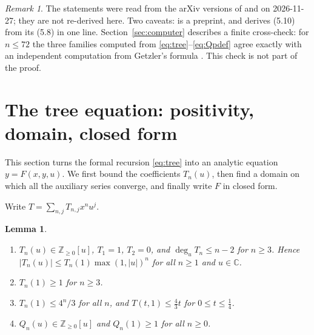 \documentclass[11pt]{amsart}
\newtheorem{lemma}[theorem]{Lemma}
\theoremstyle{definition}
\theoremstyle{remark}
\newtheorem*{remark*}{Remark}
\numberwithin{equation}{section}
\newcommand{\CC}{\mathbb{C}}
\newcommand{\ZZ}{\mathbb{Z}}
\newcommand{\abs}[1]{\lvert #1\rvert}
\begin{document}
\begin{remark*}
The statements were read from the arXiv versions of \cite{CKL} and \cite{CK} on 2026-11-27; they are not re-derived here. Two caveats: \cite{CKL} is a preprint, and \cite{CK} derives (5.10) from its (5.8) in one line. Section~\ref{sec:computer} describes a finite cross-check: for \(n\le72\) the three families computed from \eqref{eq:tree}--\eqref{eq:Qpdef} agree exactly with an independent computation from Getzler's formula \cite[Thms.~5.7, 5.9]{Ge}. This check is not part of the proof.
\end{remark*}

\section{The tree equation: positivity, domain, closed form}\label{sec:tree}

This section turns the formal recursion \eqref{eq:tree} into an analytic equation \(y=F(x,y,u)\). We first bound the coefficients \(T_n(u)\), then find a domain on which all the auxiliary series converge, and finally write \(F\) in closed form.

Write \(T=\sum_{n,j}T_{n,j}x^nu^j\).

\begin{lemma}\label{lem:pos}
\begin{enumerate}
\item \(T_n(u)\in\ZZ_{\ge0}[u]\), \(T_1=1\), \(T_2=0\), and \(\deg_uT_n\le n-2\) for \(n\ge3\). Hence \(\abs{T_n(u)}\le T_n(1)\max(1,\abs{u})^n\) for all \(n\ge1\) and \(u\in\CC\).
\item \(T_n(1)\ge1\) for \(n\ge3\).
\item \(T_n(1)\le4^n/3\) for all \(n\), and \(T(t,1)\le\frac43t\) for \(0\le t\le\frac14\).
\item \(Q_n(u)\in\ZZ_{\ge0}[u]\) and \(Q_n(1)\ge1\) for all \(n\ge0\).
\end{enumerate}
\end{lemma}
\end{document}
